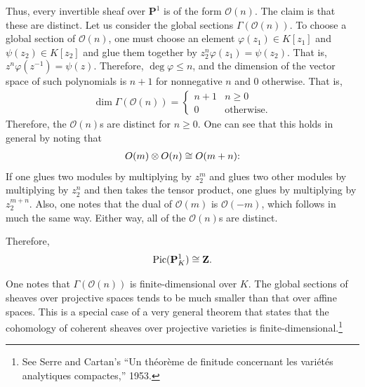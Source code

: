 \documentclass [11 pt, oneside] {article}
\begin{document}
Thus, every invertible sheaf over $\mathbf{P}^1$ is of the form $\mathscr{O}(n)$. The claim is that these are distinct. Let us consider the global sections $\Gamma(\mathscr{O}(n))$. To choose a global section of $\mathscr{O}(n)$, one must choose an element $\varphi(z_1) \in K[z_1]$ and $\psi(z_2)\in K[z_2]$ and glue them together by $z_2^n\varphi(z_1) =\psi(z_2)$. That is, $z^n\varphi(z^{-1}) = \psi (z)$. Therefore, $\deg \varphi \le n$, and the dimension of the vector space of such polynomials is $n+1$ for nonnegative $n$ and $0$ otherwise. That is,
\begin{align*}
	\dim \Gamma(\mathscr{O}(n)) = 
	\begin{cases}
		n+1&n\ge 0\\
		0 &\textrm{otherwise.}
	\end{cases}
\end{align*}
Therefore, the $\mathscr{O}(n)$s are distinct for $n\ge 0$. One can see that this holds in general by noting that
\begin{align*}
	\relax{O}(m) \otimes \relax{O}(n) \cong \relax{O}(m+n)\textrm{:}
\end{align*}
If one glues two modules by multiplying by $z_2^m$ and glues two other modules by multiplying by $z_2^n$ and then takes the tensor product, one glues by multiplying by $z_2^{m+n}$. Also, one notes that the dual of $\mathscr{O}(m)$ is $\mathscr{O}(-m)$, which follows in much the same way. Either way, all of the $\mathscr{O}(n)$s are distinct. 

Therefore, 
\begin{align*}
	\operatorname{Pic} (\mathbf{P}^1_K) \cong \mathbf{Z}.
\end{align*}

One notes that $\Gamma(\mathscr{O}(n))$ is finite-dimensional over $K$. The global sections of sheaves over projective spaces tends to be much smaller than that over affine spaces. This is a special case of a very general theorem that states that the cohomology of coherent sheaves over projective varieties is finite-dimensional.\footnote{See Serre and Cartan's ``Un th\'eor\`eme de finitude concernant les vari\'et\'es analytiques compactes,'' 1953.}
\end{document}
